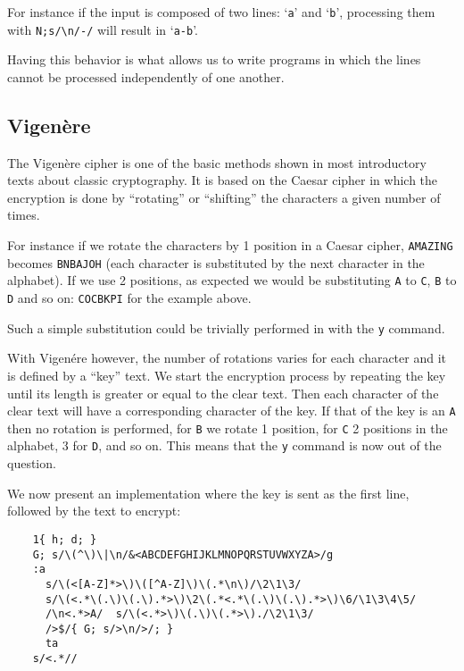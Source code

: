 For instance if the input is composed of two lines: `{\tt a}' and `{\tt b}',
processing them with \verb|N;s/\n/-/| will result in `{\tt a-b}'.

Having this behavior is what allows us to write programs in which the lines
cannot be processed independently of one another.

\subsection{Vigen\`ere}

The Vigen\`ere cipher is one of the basic methods shown in most introductory
texts about classic cryptography.  It is based on the Caesar cipher in which the
encryption is done by ``rotating'' or ``shifting'' the characters a given
number of times.

For instance if we rotate the characters by 1 position in a Caesar cipher,
{\tt AMAZING} becomes {\tt BNBAJOH} (each character is substituted by the
next character in the alphabet).  If we use 2 positions, as expected we would
be substituting {\tt A} to {\tt C}, {\tt B} to {\tt D} and so on:
{\tt COCBKPI} for the example above.

Such a simple substitution could be trivially performed in \sed* with the
{\tt y} command.

With Vigen\'ere however, the number of rotations varies for each character and
it is defined by a ``key'' text.  We start the encryption process by repeating
the key until its length is greater or equal to the clear text.  Then each
character of the clear text will have a corresponding character of the key.
If that of the key is an {\tt A} then no rotation is performed,
for {\tt B} we rotate 1 position, for {\tt C} 2 positions in the alphabet,
3 for {\tt D}, and so on.  This means that the {\tt y} command is now out of
the question.

We now present an implementation where the key is sent as the first line,
followed by the text to encrypt:

\begin{Verbatim}
	1{ h; d; }
	G; s/\(^\)\|\n/&<ABCDEFGHIJKLMNOPQRSTUVWXYZA>/g
	:a
	  s/\(<[A-Z]*>\)\([^A-Z]\)\(.*\n\)/\2\1\3/
	  s/\(<.*\(.\)\(.\).*>\)\2\(.*<.*\(.\)\(.\).*>\)\6/\1\3\4\5/
	  /\n<.*>A/  s/\(<.*>\)\(.\)\(.*>\)./\2\1\3/
	  />$/{ G; s/>\n/>/; }
	  ta
	s/<.*//
\end{Verbatim}

